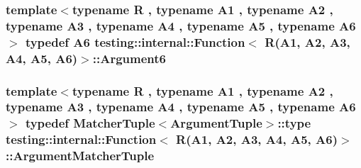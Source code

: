 \subsubsection[{\texorpdfstring{Argument6}{Argument6}}]{\setlength{\rightskip}{0pt plus 5cm}template$<$typename R , typename A1 , typename A2 , typename A3 , typename A4 , typename A5 , typename A6 $>$ typedef A6 {\bf testing\+::internal\+::\+Function}$<$ R(A1, A2, A3, A4, A5, A6)$>$\+::{\bf Argument6}}\hypertarget{structtesting_1_1internal_1_1_function_3_01_r_07_a1_00_01_a2_00_01_a3_00_01_a4_00_01_a5_00_01_a6_08_4_ab69a06609b76f3b0ef780b9ecf0a940c}{}\label{structtesting_1_1internal_1_1_function_3_01_r_07_a1_00_01_a2_00_01_a3_00_01_a4_00_01_a5_00_01_a6_08_4_ab69a06609b76f3b0ef780b9ecf0a940c}
\subsubsection[{\texorpdfstring{Argument\+Matcher\+Tuple}{ArgumentMatcherTuple}}]{\setlength{\rightskip}{0pt plus 5cm}template$<$typename R , typename A1 , typename A2 , typename A3 , typename A4 , typename A5 , typename A6 $>$ typedef {\bf Matcher\+Tuple}$<${\bf Argument\+Tuple}$>$\+::type {\bf testing\+::internal\+::\+Function}$<$ R(A1, A2, A3, A4, A5, A6)$>$\+::{\bf Argument\+Matcher\+Tuple}}\hypertarget{structtesting_1_1internal_1_1_function_3_01_r_07_a1_00_01_a2_00_01_a3_00_01_a4_00_01_a5_00_01_a6_08_4_a8555cb8e68c1e64b91b6c50a7b5951bd}{}\label{structtesting_1_1internal_1_1_function_3_01_r_07_a1_00_01_a2_00_01_a3_00_01_a4_00_01_a5_00_01_a6_08_4_a8555cb8e68c1e64b91b6c50a7b5951bd}

